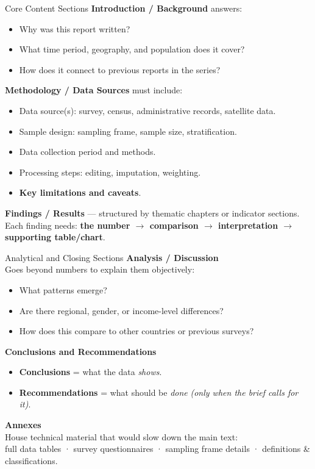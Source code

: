 \documentclass[xcolor={table,dvipsnames},aspectratio=169,11pt]{beamer}
\begin{document}
\begin{frame}{Core Content Sections}
    \small
    \textbf{Introduction / Background} answers:
    \begin{itemize}
        \item Why was this report written?
        \item What time period, geography, and population does it cover?
        \item How does it connect to previous reports in the series?
    \end{itemize}
    \vskip 0.15cm
    \textbf{Methodology / Data Sources} must include:
    \begin{itemize}
        \item Data source(s): survey, census, administrative records, satellite data.
        \item Sample design: sampling frame, sample size, stratification.
        \item Data collection period and methods.
        \item Processing steps: editing, imputation, weighting.
        \item \textbf{Key limitations and caveats}.
    \end{itemize}
    \vskip 0.15cm
    \textbf{Findings / Results} --- structured by thematic chapters or indicator sections. Each finding needs: \textbf{the number $\rightarrow$ comparison $\rightarrow$ interpretation $\rightarrow$ supporting table/chart}.
\end{frame}

\begin{frame}{Analytical and Closing Sections}
    \small
    \textbf{Analysis / Discussion} \\
    Goes beyond numbers to explain them objectively:
    \begin{itemize}
        \item What patterns emerge?
        \item Are there regional, gender, or income-level differences?
        \item How does this compare to other countries or previous surveys?
    \end{itemize}
    \vskip 0.15cm
    \textbf{Conclusions and Recommendations}
    \begin{itemize}
        \item \textbf{Conclusions} = what the data \emph{shows}.
        \item \textbf{Recommendations} = what should be \emph{done} \textit{(only when the brief calls for it)}.
    \end{itemize}
    \vskip 0.15cm
    \textbf{Annexes} \\
    House technical material that would slow down the main text: \\
    \small full data tables · survey questionnaires · sampling frame details · definitions \& classifications.
\end{frame}
\end{document}
